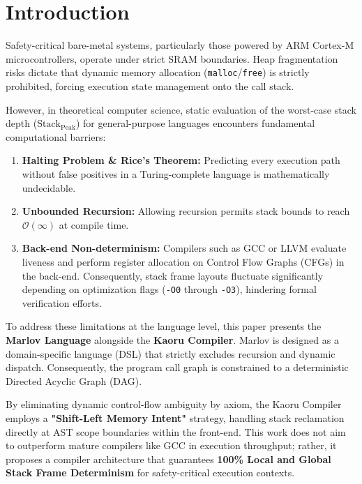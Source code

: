 \documentclass[conference]{IEEEtran}
\begin{document}
\section{Introduction}
Safety-critical bare-metal systems, particularly those powered by ARM Cortex-M microcontrollers, operate under strict SRAM boundaries. Heap fragmentation risks dictate that dynamic memory allocation (\texttt{malloc}/\texttt{free}) is strictly prohibited, forcing execution state management onto the call stack.

However, in theoretical computer science, static evaluation of the worst-case stack depth ($\mathrm{Stack}_{\mathrm{Peak}}$) for general-purpose languages encounters fundamental computational barriers:
\begin{enumerate}
    \item \textbf{Halting Problem \& Rice's Theorem:} Predicting every execution path without false positives in a Turing-complete language is mathematically undecidable.
    \item \textbf{Unbounded Recursion:} Allowing recursion permits stack bounds to reach $\mathcal{O}(\infty)$ at compile time.
    \item \textbf{Back-end Non-determinism:} Compilers such as GCC or LLVM evaluate liveness and perform register allocation on Control Flow Graphs (CFGs) in the back-end. Consequently, stack frame layouts fluctuate significantly depending on optimization flags (\texttt{-O0} through \texttt{-O3}), hindering formal verification efforts.
\end{enumerate}

To address these limitations at the language level, this paper presents the \textbf{Marlov Language} alongside the \textbf{Kaoru Compiler}. Marlov is designed as a domain-specific language (DSL) that strictly excludes recursion and dynamic dispatch. Consequently, the program call graph is constrained to a deterministic Directed Acyclic Graph (DAG).

By eliminating dynamic control-flow ambiguity by axiom, the Kaoru Compiler employs a \textbf{"Shift-Left Memory Intent"} strategy, handling stack reclamation directly at AST scope boundaries within the front-end. This work does not aim to outperform mature compilers like GCC in execution throughput; rather, it proposes a compiler architecture that guarantees \textbf{100\% Local and Global Stack Frame Determinism} for safety-critical execution contexts.
\end{document}
